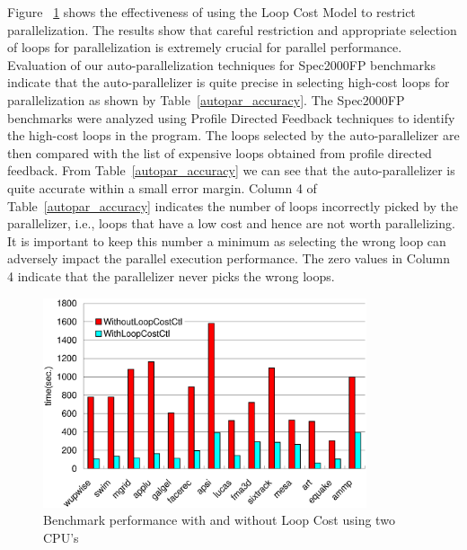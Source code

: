 Figure ~\ref{fig:loopcost_performance} shows the effectiveness of using the
Loop Cost Model to restrict parallelization. The results show that
careful restriction and appropriate selection of loops for
parallelization is extremely crucial for parallel performance.
Evaluation of our auto-parallelization techniques for Spec2000FP
benchmarks indicate that the auto-parallelizer is quite precise in
selecting high-cost loops for parallelization as shown by
Table~\ref{autopar_accuracy}. The Spec2000FP benchmarks were analyzed
using Profile Directed Feedback techniques \cite{Cohn99} \cite{Sch98}
to identify the high-cost loops in the program. The loops selected by
the auto-parallelizer are then compared with the list of expensive
loops obtained from profile directed feedback. From
Table~\ref{autopar_accuracy} we can see that the auto-parallelizer is
quite accurate within a small error margin.  Column 4 of
Table~\ref{autopar_accuracy} indicates the number of loops incorrectly
picked by the parallelizer, i.e., loops that have a low cost and hence are not
worth parallelizing. It is important to keep this number a minimum as
selecting the wrong loop can adversely impact the parallel execution
performance. The zero values in Column 4 indicate that the
parallelizer never picks the wrong loops.


\begin{figure}[h!]
  \begin{center}
    \includegraphics[angle=0, width=0.85\textwidth]{loopcost.eps}
    \caption{\footnotesize Benchmark performance with and without Loop Cost using two CPU's}
    \label{fig:loopcost_performance}
  \end{center}
\end{figure}


